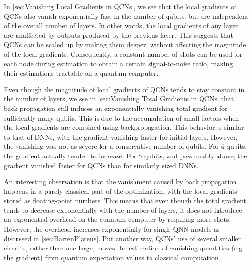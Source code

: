 In \cref{sec:Vanishing Local Gradients in QCNs}, we see that the local gradients of QCNs also vanish exponentially fast in the number of qubits, but are independent of the overall number of layers. In other words, the local gradients of any layer are unaffected by outputs produced by the previous layer. This suggests that QCNs can be scaled up by making them deeper, without affecting the magnitude of the local gradients. Consequently, a constant number of shots can be used for each node during estimation to obtain a certain signal-to-noise ratio, making their estimations tractable on a quantum computer. 

Even though the magnitude of local gradients of QCNs tends to stay constant in the number of layers, we see in \cref{sec:Vanishing Total Gradients in QCNs} that back propagation still induces an exponentially vanishing total gradient for sufficiently many qubits. This is due to the accumulation of small factors when the local gradients are combined using backpropagation. This behavior is similar to that of DNNs, with the gradient vanishing faster for initial layers. However, the vanishing was not as severe for a conservative number of qubits. For 4 qubits, the gradient actually tended to increase. For 8 qubits, and presumably above, the gradient vanished faster for QCNs than for similarly sized DNNs.  

An interesting observation is that the vanishment caused by back propagation happens in a purely classical part of the optimization, with the local gradients stored as floating-point numbers. This means that even though the total gradient tends to decrease exponentially with the number of layers, it does not introduce an exponential overhead on the quantum computer by requiring more shots. However, the overhead increases exponentially for single-QNN models as discussed in \cref{sec:BarrenPlateus}. Put another way, QCNs' use of several smaller circuits, rather than one large, moves the estimation of vanishing quantities (e.g. the gradient) from quantum expectation values to classical computation. 



